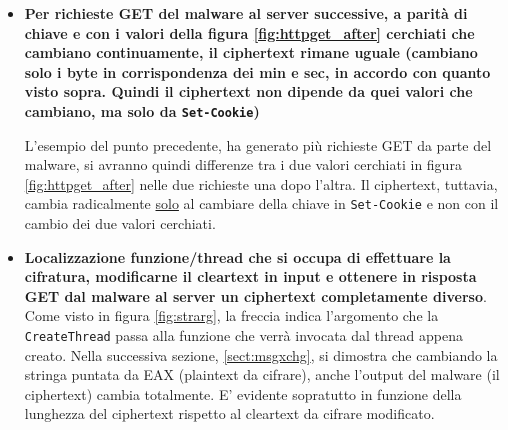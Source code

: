 \documentclass[
    a4paper, %
    11pt %
]{article}
\newcommand{\pic}[4]{\begin{figure}[H]
            \centering
            \texttt{[image: \#1]}
            \caption{#2}
            \label{fig:#1}
            \end{figure}}
\begin{document}
\begin{itemize}
                    I cambiamenti che si notano tra i ciphertext (fig. \ref{fig:ct0} e \ref{fig:ct1}) sono proprio in corrispondenza dei diversi
                    minuti e secondi dei due rispettivi cleartext (fig. \ref{fig:pt0} e \ref{fig:pt1}).

                    \pic{pt2}{Cleartext terzo istante}{10cm}{1.5cm}
                    \pic{ct2}{Ciphertext terzo istante, chiave \underline{diversa}: \texttt{ifbeuyv}}{10cm}{2cm}

                    E oltretutto, anche con chiave diversa, la \underline{lunghezza del ciphertext è sempre
                    uguale a quella del cleartext}
                \item \textbf{Per richieste GET del malware al server successive, a parità di chiave e con
                    i valori della figura \ref{fig:httpget_after} cerchiati che cambiano continuamente, il ciphertext
                    rimane uguale (cambiano solo i byte in corrispondenza dei min e sec, in accordo con quanto visto sopra. Quindi il ciphertext non dipende da quei valori che cambiano, ma solo da \texttt{Set-Cookie})}

                    L'esempio del punto precedente, ha generato più richieste GET da parte del malware, 
                    si avranno quindi differenze tra i due valori cerchiati in figura \ref{fig:httpget_after}
                    nelle due richieste una dopo l'altra. Il ciphertext, tuttavia, cambia radicalmente \underline{solo}
                    al cambiare della chiave in \texttt{Set-Cookie} e non con il cambio dei due valori cerchiati.
                    
                \item \textbf{Localizzazione funzione/thread che si occupa di effettuare la cifratura,
                    modificarne il cleartext in input e ottenere in risposta GET dal malware al server un ciphertext 
                    completamente diverso}. Come visto in figura \ref{fig:strarg}, la freccia indica l'argomento
                    che la \texttt{CreateThread} passa alla funzione che verrà invocata dal thread appena creato.
                    Nella successiva sezione, \ref{sect:msgxchg}, si dimostra che cambiando la stringa puntata
                    da EAX (plaintext da cifrare), anche l'output del malware (il ciphertext) cambia totalmente. E' evidente sopratutto
                    in funzione della lunghezza del ciphertext rispetto al cleartext da cifrare modificato.
            \end{itemize}
            
\end{document}
